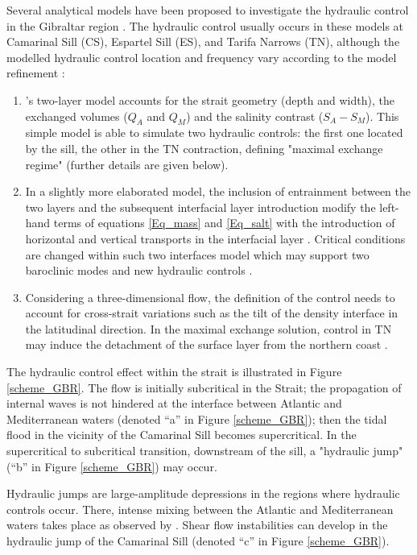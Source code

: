 Several analytical models have been proposed to investigate the hydraulic control in the Gibraltar region \citep{BS84,FA1986,Garett90}. The hydraulic control usually occurs in these models at Camarinal Sill (CS), Espartel Sill (ES), and Tarifa Narrows (TN), although the modelled hydraulic control location and frequency vary according to the model refinement :

\begin{enumerate}
\item{\citet{FA1986}'s two-layer model accounts for the strait geometry (depth and width), the exchanged volumes ($Q_A$ and $Q_M$) and the salinity contrast ($S_A -S_M$). This simple model is able to simulate two hydraulic controls: the first one located by the sill, the other in the TN contraction, defining "maximal exchange regime"  (further details are given below). }
\item{In a slightly more elaborated model, the inclusion of entrainment between the two layers and the subsequent interfacial layer introduction modify the left-hand terms of equations \ref{Eq_mass} and \ref{Eq_salt} with the introduction of horizontal and vertical transports in the interfacial layer \citep{Bray95}.  Critical conditions are changed within such two interfaces model which may support two baroclinic modes and new hydraulic controls \citep{Sannino2009b}.}
\item{Considering a three-dimensional flow, the definition of the control needs to account for cross-strait variations such as the tilt of the density interface in the latitudinal direction. In the maximal exchange solution, control in TN may induce the detachment of the surface layer from the northern coast \citep{Sannino2009b}.}
\end{enumerate}

The hydraulic control effect within the strait is illustrated in Figure \ref{scheme_GBR}. The flow is initially subcritical in the Strait; the propagation of internal waves is not hindered at the interface between Atlantic and Mediterranean waters (denoted ``a'' in Figure \ref{scheme_GBR}); then the tidal flood in the vicinity of the Camarinal Sill becomes supercritical. In the supercritical to subcritical transition, downstream of the sill, a "hydraulic jump" (``b'' in Figure \ref{scheme_GBR}) may occur.

Hydraulic jumps are large-amplitude depressions in the regions where hydraulic controls occur. There, intense mixing between the Atlantic and Mediterranean waters takes place as observed by \citet{Wesson94}. Shear flow instabilities can develop in the hydraulic jump of the Camarinal Sill (denoted ``c'' in Figure \ref{scheme_GBR}). 

